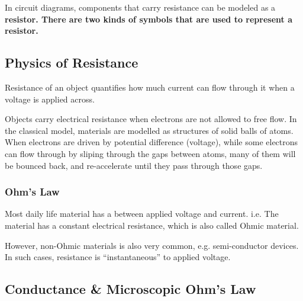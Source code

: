\documentclass[class=article, crop=false, 12pt]{standalone}
\begin{document}
In circuit diagrams, components that carry resistance can be modeled as a \bf{resistor}.
There are two kinds of symbols that are used to represent a resistor.






\subsection{Physics of Resistance}

Resistance of an object quantifies how much current can flow through it 
when a voltage is applied across. 

Objects carry electrical resistance when electrons are not allowed to free flow.
In the classical model, materials are modelled as structures of solid balls of atoms.
When electrons are driven by potential difference (voltage), 
while some electrons can flow through by sliping through the gaps between atoms, 
many of them will be bounced back, and re-accelerate until they pass through those gaps.




\subsubsection{Ohm's Law}

Most daily life material has a  between applied voltage and current. 
i.e. The material has a constant electrical resistance, which is also called Ohmic material. 




However, non-Ohmic materials is also very common, e.g. semi-conductor devices.
In such cases, resistance is ``instantaneous'' to applied voltage. 



\subsection{Conductance \& Microscopic Ohm's Law}
\end{document}
